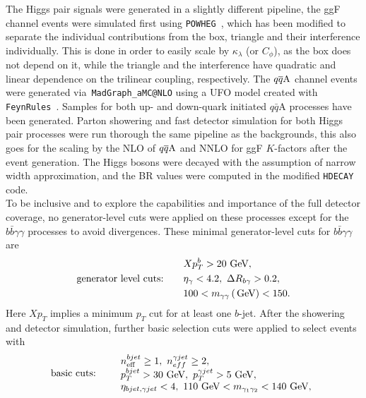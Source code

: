 The Higgs pair signals were generated in a slightly different pipeline, the ggF channel events were simulated first using \texttt{POWHEG}~\cite{Heinrich:2017kxx,Heinrich:2019bkc,Heinrich:2020ckp}, which has been modified to separate the individual contributions from the box, triangle and their interference individually.  This is done in order to easily scale by $\kappa_\lambda$ (or $C_\phi$), as the box does not depend on it, while the triangle and the interference have quadratic and linear dependence on the trilinear coupling, respectively. The $q\overline q \rm A$ channel events were generated via~\texttt{MadGraph\_aMC@NLO} using a UFO model created with \texttt{FeynRules}~\cite{Alloul:2013bka}. Samples for both up- and down-quark initiated $q\bar q$A processes have been generated. Parton showering and fast detector simulation for both Higgs pair processes were run thorough the same pipeline as the backgrounds, this also goes for the scaling by the NLO  of $ q\overline q \rm A$ and NNLO for ggF $K$-factors after the event generation. The Higgs bosons were decayed with the assumption of narrow width approximation, and the BR values were computed in the modified \texttt{HDECAY} code. 
\\
To be inclusive and to explore the capabilities and importance of the full detector coverage, no generator-level cuts were applied on these processes except for the $b\bar b \gamma\gamma$ processes to avoid divergences. These minimal generator-level cuts for $b\bar b\gamma\gamma$ are
\begin{equation}
	\begin{aligned}
		& Xp_T^b>20\,\,\textrm{GeV}, \\
		\textrm{generator level cuts:}\qquad& \eta_\gamma<4.2,~ \Delta R_{b\gamma}>0.2, \\
		& 100< m_{\gamma\gamma} \,(\,\textrm{GeV}) < 150.
	\end{aligned}
\end{equation}
Here $Xp_T$ implies a minimum $p_T$ cut for at least one $b$-jet. 
After the showering and detector simulation, further basic selection cuts were applied to select events with
\begin{equation}
	\textrm{basic cuts:}\qquad
	\begin{array}{l}
		n_{\mathrm{eff}}^{bjet}\geq 1,~n_{eff}^{\gamma jet} \geq 2,\\
		p_T^{bjet}>30\,\,\textrm{GeV},~p_T^{\gamma jet}>5\,\,\textrm{GeV},\\
		\eta_{bjet,\gamma jet}<4,~ 110\, \,\textrm{GeV} < m_{\gamma_1\gamma_2} < 140\,\,\textrm{GeV},
	\end{array}
	\label{eqn:bcuts}
\end{equation}
